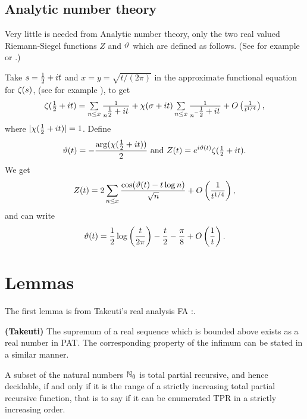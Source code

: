 \documentclass[12pt]{article}
\begin{document}
\subsection{Analytic number theory}

Very little is needed from Analytic number theory, only the two real valued Riemann-Siegel functions $Z$ and $\vartheta$ which are defined as follows. (See for example \cite[Section 6.5]{edwards} or \cite[Section 4.17]{tit}.)\par

Take $s=\textstyle{\frac{1}{2}}+it$ and $x=y=\sqrt{t/(2\pi)}$ in the approximate functional equation for $\zeta(s)$, (see for example \cite[Theorem G.2]{bro}), to get
$$
\zeta(\textstyle{\frac{1}{2}}+it)= \sum\limits_{n\le x} \frac{1}{n^{\textstyle{\frac{1}{2}}+it}}+\chi(\sigma+it)\sum\limits_{n\le x} \frac{1}{n^{-\textstyle{\frac{1}{2}}+it}}+O\left(\frac{1}{t^{1/4}}\right),
$$
where $|\chi(\textstyle{\frac{1}{2}}+it)|=1$. Define 
$$
\vartheta(t)=-\frac{\arg(\chi(\textstyle{\frac{1}{2}}+it))}{2} \text{ and } Z(t)=e^{i\vartheta(t)}\zeta(\textstyle{\frac{1}{2}}+it).
$$
We get 
$$
Z(t)=2\sum_{n\le x} \frac{\cos(\vartheta(t)-t\log n)}{\sqrt{n}}+O\left(\frac{1}{t^{1/4}}\right), 
$$
and can write
$$
\vartheta(t)= \frac{1}{2}\log\left(\frac{t}{2\pi}\right)-\frac{t}{2}-\frac{\pi}{8}+O\left(\frac{1}{t}\right).
$$

\bigskip

\section{Lemmas}
\label{lems}

The first lemma is from Takeuti's real analysis FA \cite[Chapter 3]{tak}:.
\begin{lemma}{\bf (Takeuti)}\cite[Proposition 3.5.1]{tak}
\label{tak3.5.1}
The supremum of a real sequence which is bounded above exists as a real number in PAT. The corresponding property of the infimum can be stated in a similar manner.
\end{lemma}


\begin{lemma}\cite[Theorem N.10]{bro}\cite[Theorem 7-2.14]{cut}
\label{thm:cut7-2.14}
A subset of the natural numbers $\mathbb{N}_0$ is total partial recursive, and hence decidable, if and only if it is the range of a strictly increasing total partial recursive function, that is to say if it can be enumerated TPR in a strictly increasing order.
\end{lemma}
\end{document}
